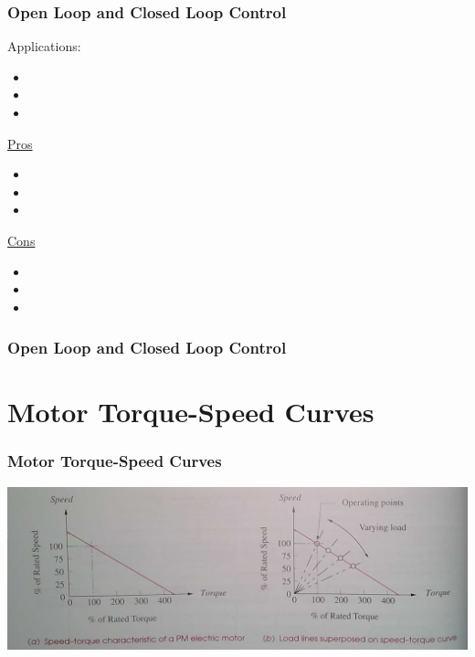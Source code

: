 \documentclass[fleqn]{beamer} %
\newcommand{\sectiontitleII}{Open Loop and Closed Loop Control}
\newcommand{\sectiontitleIII}{Motor Torque-Speed Curves}
\begin{document}
	\begin{frame} \small
		\frametitle{\sectiontitleII}

		Applications:
		\begin{itemize}
			\item  
			\item
			\item
        \end{itemize}

        \begin{multicols}{2}
		\underline{Pros}
		\begin{itemize}
		\item
		\item
		\item
		\end{itemize}
		\underline{Cons}
		\begin{itemize}
		\item 
		\item
		\item
		\end{itemize}
		\end{multicols}

	\end{frame}

	


	\begin{frame}[label=sectionI] \small
		\frametitle{\sectiontitleII}

	\end{frame}

\section{\sectiontitleIII}	

	\begin{frame}[label=sectionIII] \small
		\frametitle{\sectiontitleIII}
	 		

		\includegraphics[scale=.25]{images/torque_speed_permanent_magnet.png}

	        
		\end{frame}  
\end{document}
